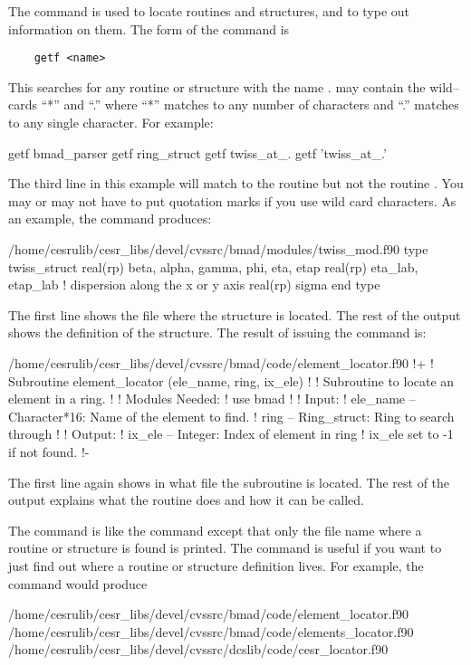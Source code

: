 The  command is used to locate routines and structures, and
to type out information on them.  The form of the command is
\begin{verbatim}
    getf <name>
\end{verbatim}
This searches for any routine or structure with the name
.  may contain the wild--cards ``*'' and ``.'' where
``*'' matches to any number of characters and ``.'' matches to any
single character. For example:
\begin{example}
    getf bmad_parser
    getf ring_struct
    getf twiss_at_.
    getf 'twiss_at_.'
\end{example}
The third line in this example will match to the routine
 but not the routine . You may or may not
have to put quotation marks if you use wild card characters.
As an example, the command  produces:
\begin{example}
  /home/cesrulib/cesr_libs/devel/cvssrc/bmad/modules/twiss_mod.f90
    type twiss_struct
      real(rp) beta, alpha, gamma, phi, eta, etap
      real(rp) eta_lab, etap_lab   ! dispersion along the x or y axis
      real(rp) sigma
    end type
\end{example}
The first line shows the file where the structure is located. The rest of the
output shows the definition of the  structure. 
The result of issuing the command  is:
\begin{example}
  /home/cesrulib/cesr_libs/devel/cvssrc/bmad/code/element_locator.f90
  !+
  ! Subroutine element_locator (ele_name, ring, ix_ele)
  !
  ! Subroutine to locate an element in a ring. 
  !
  ! Modules Needed:
  !   use bmad
  !
  ! Input:
  !   ele_name -- Character*16: Name of the element to find.
  !   ring     -- Ring_struct: Ring to search through
  !
  ! Output:
  !   ix_ele -- Integer: Index of element in ring%
  !               ix_ele set to -1 if not found.
  !-
\end{example}
The first line again shows in what file the subroutine is located.
The rest of the output explains what the routine does and how it
can be called.

The  command is like the  command except that only
the file name where a routine or structure is found is printed.
The  command is useful if you
want to just find out where a routine or structure definition lives.
For example, the  command would produce
\begin{example}
  /home/cesrulib/cesr_libs/devel/cvssrc/bmad/code/element_locator.f90
  /home/cesrulib/cesr_libs/devel/cvssrc/bmad/code/elements_locator.f90
  /home/cesrulib/cesr_libs/devel/cvssrc/dcslib/code/cesr_locator.f90
\end{example}

